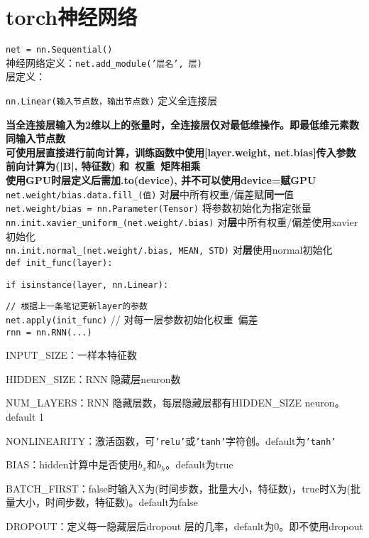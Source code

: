 \documentclass[UTF8]{ctexart}
\begin{document}
\section{torch神经网络}
\noindent \texttt{net = nn.Sequential()}\\
神经网络定义：\texttt{net.add\_module('层名', 层)}\\
层定义：

  \texttt{nn.Linear(输入节点数，输出节点数)} 定义全连接层
  
  \quad \textbf{当全连接层输入为2维以上的张量时，全连接层仅对最低维操作。即最低维元素数同输入节点数}\\
\textbf{可使用层直接进行前向计算，训练函数中使用[layer.weight, net.bias]传入参数}\\
\textbf{前向计算为(|B|, 特征数) 和\ 权重\ 矩阵相乘}\\
\textbf{使用GPU时层定义后需加.to(device), 并不可以使用device=赋GPU}\\
\texttt{net.weight/bias.data.fill\_(值)} 对\textbf{层}中所有权重/偏差赋\textbf{同一}值\\
\texttt{net.weight/bias = nn.Parameter(Tensor)} 将参数初始化为指定张量\\
\texttt{nn.init.xavier\_uniform\_(net.weight/.bias)} 对\textbf{层}中所有权重/偏差使用xavier初始化\\
\texttt{nn.init.normal\_(net.weight/.bias, MEAN, STD)} 对\textbf{层}使用normal初始化\\
\texttt{def init\_func(layer):}

  \texttt{if isinstance(layer, nn.Linear):}

  \quad \texttt{// 根据上一条笔记更新layer的参数}\\
\texttt{net.apply(init\_func)} // 对每一层参数初始化权重\ 偏差\\
\texttt{rnn = nn.RNN(...)}
  
  INPUT\_SIZE：一样本特征数
  
  HIDDEN\_SIZE：RNN 隐藏层neuron数
  
  NUM\_LAYERS：RNN 隐藏层数，每层隐藏层都有HIDDEN\_SIZE neuron。default 1
  
  NONLINEARITY：激活函数，可\texttt{'relu'}或\texttt{'tanh'}字符创。default为\texttt{'tanh'}

  BIAS：hidden计算中是否使用$b_x$和$b_h$。default为true

  BATCH\_FIRST：false时输入X为(时间步数，批量大小，特征数)，true时X为(批量大小，时间步数，特征数)。default为false

  DROPOUT：定义每一隐藏层后dropout 层的几率，default为0。即不使用dropout
\end{document}
